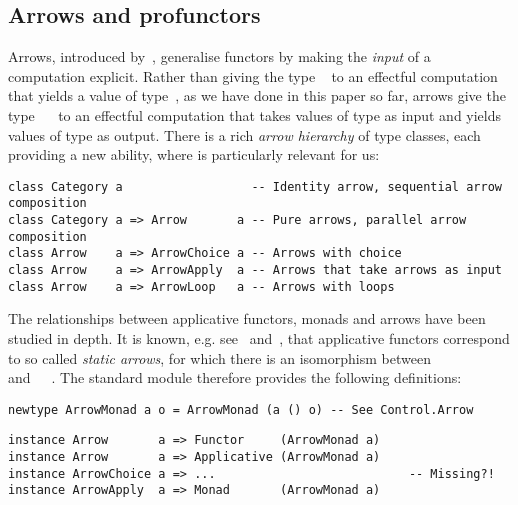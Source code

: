\subsection{Arrows and profunctors}\label{sec-arrows}

Arrows, introduced by~\citet{hughes2000arrows}, generalise functors by making
the \emph{input} of a computation explicit. Rather than giving the type
~ to an effectful computation that yields a value of type~, as
we have done in this paper so far, arrows give the type ~~ to
an effectful computation that takes values of type  as input and yields
values of type  as output. There is a rich \emph{arrow hierarchy} of type
classes, each providing a new ability, where  is particularly
relevant for us:

\vspace{1mm}
\begin{verbatim}
class Category a                  -- Identity arrow, sequential arrow composition
class Category a => Arrow       a -- Pure arrows, parallel arrow composition
class Arrow    a => ArrowChoice a -- Arrows with choice
class Arrow    a => ArrowApply  a -- Arrows that take arrows as input
class Arrow    a => ArrowLoop   a -- Arrows with loops
\end{verbatim}
\vspace{1mm}

\noindent
The relationships between applicative functors, monads and arrows have been
studied in depth. It is known, e.g. see~\citet{lindley2011idioms}
and~\citet{rivas2017notions}, that applicative functors correspond to so called
\emph{static arrows}, for which there is an isomorphism between
~\hs{()}~\hs{(}~\hs{->}~ and~~~. The
standard module  therefore provides the following
definitions:

\vspace{1mm}
\begin{verbatim}
newtype ArrowMonad a o = ArrowMonad (a () o) -- See Control.Arrow
\end{verbatim}
\vspace{1mm}
\begin{verbatim}
instance Arrow       a => Functor     (ArrowMonad a)
instance Arrow       a => Applicative (ArrowMonad a)
instance ArrowChoice a => ...                           -- Missing?!
instance ArrowApply  a => Monad       (ArrowMonad a)
\end{verbatim}
\vspace{1mm}

